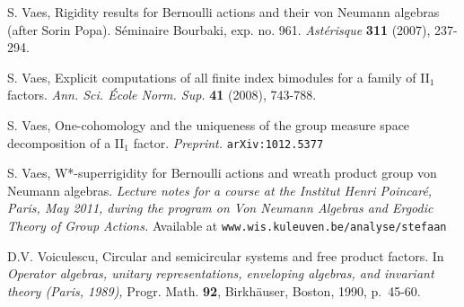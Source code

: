\documentclass[a4paper,11pt]{amsart}
\numberwithin{equation}{section}
\begin{document}
\begin{thebibliography}{ABC90}
 {S. Vaes}, Rigidity results for Bernoulli actions and their von Neumann algebras (after Sorin
Popa). S\'{e}minaire Bourbaki, exp. no. 961. \emph{Ast\'{e}risque} {\bf 311} (2007), 237-294.

 {S. Vaes},
Explicit computations of all finite index bimodules for a family of II$_1$ factors.
\emph{Ann. Sci. \'{E}cole Norm. Sup.} {\bf 41} (2008), 743-788.

 {S. Vaes}, One-cohomology and the uniqueness of the group measure space decomposition of a II$_1$ factor. {\it Preprint.} {\tt arXiv:1012.5377}

 {S. Vaes}, W*-superrigidity for Bernoulli actions and wreath product group von Neumann algebras. {\it Lecture notes for a course at the Institut Henri Poincar\'{e}, Paris, May 2011, during the program on Von Neumann Algebras and Ergodic Theory of Group Actions.} Available at {\tt www.wis.kuleuven.be/analyse/stefaan}

 {D.V. Voiculescu},
Circular and semicircular systems and free product factors.
In {\it Operator algebras, unitary representations, enveloping algebras, and invariant theory (Paris, 1989),}
Progr. Math. {\bf 92}, Birkh\"{a}user, Boston, 1990, p.\ 45-60.

\end{thebibliography}
\end{document}
